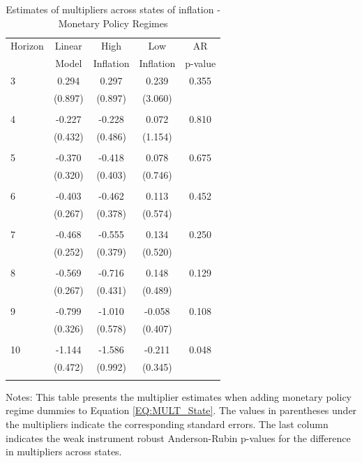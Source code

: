 \documentclass[12pt]{article}
\newcommand{\annote}[1]{\parbox{\textwidth}{\renewcommand{\baselinestretch}{1.0}\vspace{12pt} \footnotesize Notes: #1}}
\begin{document}
\begin{appendices}
\begin{singlespace}
\begin{table}[ht]
\footnotesize
\centering
\def\sym#1{\ifmmode^{#1}\else\(^{#1}\)\fi}
\caption{Estimates of multipliers across states of inflation - Monetary Policy Regimes \label{T:SDPM_MP}}
\begin{tabular}{l*{1}{cccc}}
\hline\hline
 Horizon  & Linear & High                 & Low           & AR            \\
                  & Model         & Inflation & Inflation & p-value       \\
\hline
   3       & 0.294 & 0.297 & 0.239 & 0.355 \\
          & (0.897) & (0.897) & (3.060) & \\
 & & & &\\
   4       & -0.227 & -0.228 & 0.072 & 0.810 \\
          & (0.432) & (0.486) & (1.154) & \\
 & & & &\\
   5       & -0.370 & -0.418 & 0.078 & 0.675 \\
          & (0.320) & (0.403) & (0.746) & \\
 & & & &\\
   6       & -0.403 & -0.462 & 0.113 & 0.452 \\
          & (0.267) & (0.378) & (0.574) & \\
 & & & &\\
   7       & -0.468 & -0.555 & 0.134 & 0.250 \\
          & (0.252) & (0.379) & (0.520) & \\
 & & & &\\
   8       & -0.569 & -0.716 & 0.148 & 0.129 \\
          & (0.267) & (0.431) & (0.489) & \\
 & & & &\\
   9       & -0.799 & -1.010 & -0.058 & 0.108 \\
          & (0.326) & (0.578) & (0.407) & \\
 & & & &\\
  10       & -1.144 & -1.586 & -0.211 & 0.048 \\
          & (0.472) & (0.992) & (0.345) & \\
 & & & &\\
\hline\hline
\end{tabular}
\annote{\footnotesize This table presents the multiplier estimates when adding monetary policy regime dummies to Equation \eqref{EQ:MULT_State}. The values in parentheses under the multipliers indicate the corresponding standard errors. The last column indicates the weak instrument robust Anderson-Rubin p-values for the difference in multipliers across states.}
\end{table}


\end{singlespace}
\end{appendices}
\end{document}
